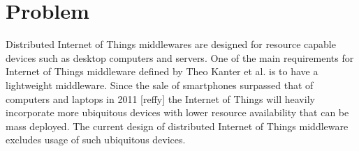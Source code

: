 \section{Problem}
Distributed Internet of Things middlewares are designed for resource capable devices such as desktop computers and servers. One of the main requirements for Internet of Things middleware defined by Theo Kanter et al. \cite{Kanter539187} is to have a lightweight middleware. Since the sale of smartphones surpassed that of computers and laptops in 2011 [reffy] the Internet of Things will heavily incorporate more ubiquitous devices with lower resource availability that can be mass deployed. The current design of distributed Internet of Things middleware excludes usage of such ubiquitous devices.
